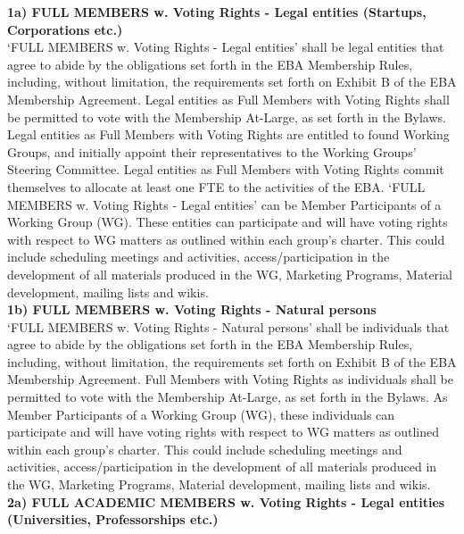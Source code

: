 \documentclass{article}
\begin{document}
\textbf{1a) FULL MEMBERS w. Voting Rights - Legal entities (Startups, Corporations etc.)} \\

‘FULL MEMBERS w. Voting Rights - Legal entities’ shall be legal entities that agree to abide by the obligations set forth in the EBA Membership Rules, including, without limitation, the requirements set forth on Exhibit B of the EBA Membership Agreement. 
Legal entities as Full Members with Voting Rights shall be permitted to vote with the Membership At-Large, as set forth in the Bylaws. 
Legal entities as Full Members with Voting Rights are entitled to found Working Groups, and initially appoint their representatives to the Working Groups’ Steering Committee. 
Legal entities as Full Members with Voting Rights commit themselves to allocate at least one FTE to the activities of the EBA. 
‘FULL MEMBERS w. Voting Rights - Legal entities’ can be Member Participants of a Working Group (WG). These entities can participate and will have voting rights with respect to WG matters as outlined within each group's charter. 
This could include scheduling meetings and activities, access/participation in the development of all materials produced in the WG, Marketing Programs, Material development, mailing lists and wikis. \\

\textbf{1b) FULL MEMBERS w. Voting Rights - Natural persons} \\

‘FULL MEMBERS w. Voting Rights - Natural persons’ shall be individuals that agree to abide by the obligations set forth in the EBA Membership Rules, including, without limitation, the requirements set forth on Exhibit B of the EBA Membership Agreement. 
Full Members with Voting Rights as individuals shall be permitted to vote with the Membership At-Large, as set forth in the Bylaws. 
As Member Participants of a Working Group (WG), these individuals can participate and will have voting rights with respect to WG matters as outlined within each group's charter. 
This could include scheduling meetings and activities, access/participation in the development of all materials produced in the WG, Marketing Programs, Material development, mailing lists and wikis. \\

\textbf{2a) FULL ACADEMIC MEMBERS w. Voting Rights - Legal entities (Universities, Professorships etc.)}
\end{document}
